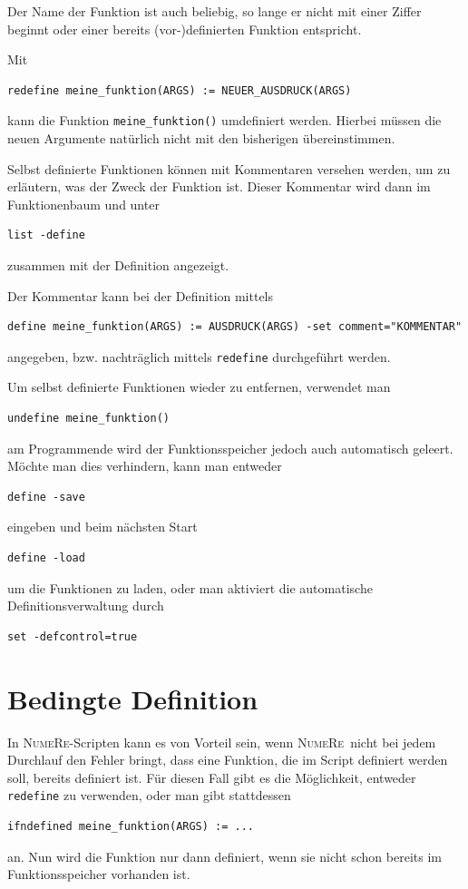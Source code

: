 \documentclass[DIV=14,headsepline,footsepline]{scrbook}
\newcommand{\NR}{\textsc{Nu\-me\-Re}}
\begin{document}
				Der Name der Funktion ist auch beliebig, so lange er nicht mit einer Ziffer beginnt oder einer bereits (vor-)definierten Funktion entspricht.
				
				Mit
				\begin{lstlisting}
redefine meine_funktion(ARGS) := NEUER_AUSDRUCK(ARGS)
				\end{lstlisting}
				kann die Funktion \lstinline+meine_funktion()+ umdefiniert werden. Hierbei müssen die neuen Argumente natürlich nicht mit den bisherigen übereinstimmen.
				
				Selbst definierte Funktionen können mit Kommentaren versehen werden, um zu erläutern, was der Zweck der Funktion ist. Dieser Kommentar wird dann im Funktionenbaum und unter
				\begin{lstlisting}
list -define
				\end{lstlisting}
				zusammen mit der Definition angezeigt.
				
				Der Kommentar kann bei der Definition mittels
				\begin{lstlisting}
define meine_funktion(ARGS) := AUSDRUCK(ARGS) -set comment="KOMMENTAR"
				\end{lstlisting}
				angegeben, bzw. nachträglich mittels \lstinline+redefine+ durchgeführt werden.
				
				Um selbst definierte Funktionen wieder zu entfernen, verwendet man
				\begin{lstlisting}
undefine meine_funktion()
				\end{lstlisting}
				am Programmende wird der Funktionsspeicher jedoch auch automatisch geleert. Möchte man dies verhindern, kann man entweder
				\begin{lstlisting}
define -save
				\end{lstlisting}
				eingeben und beim nächsten Start
				\begin{lstlisting}
define -load
				\end{lstlisting}
				um die Funktionen zu laden, oder man aktiviert die automatische Definitionsverwaltung durch
				\begin{lstlisting}
set -defcontrol=true
				\end{lstlisting}
				
			\section{Bedingte Definition}
				In \NR-Scripten kann es von Vorteil sein, wenn \NR\ nicht bei jedem Durchlauf den Fehler bringt, dass eine Funktion, die im Script definiert werden soll, bereits definiert ist. Für diesen Fall gibt es die Möglichkeit, entweder \lstinline+redefine+ zu verwenden, oder man gibt stattdessen
				\begin{lstlisting}
ifndefined meine_funktion(ARGS) := ...
				\end{lstlisting}
				an. Nun wird die Funktion nur dann definiert, wenn sie nicht schon bereits im Funktionsspeicher vorhanden ist.
\end{document}
